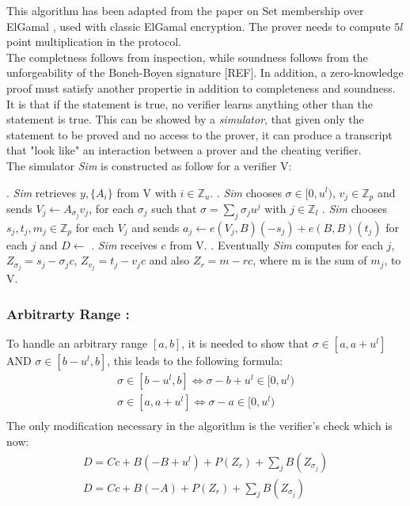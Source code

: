 \documentclass{article}
\begin{document}
This algorithm has been adapted from the paper on Set membership over ElGamal \cite{range}, used with classic ElGamal encryption. The prover needs to compute $5l$ point multiplication in the protocol.\\
The completness follows from inspection, while soundness follows from the unforgeability of the Boneh-Boyen signature [REF].
In addition, a zero-knowledge proof must satisfy another propertie in addition to completeness and soundness. It is that if the statement is true, no verifier learns anything other than the statement is true.
This can be showed by a \textit{simulator}, that given only the statement to be proved and no access to the prover, it can produce a transcript that "look like" an interaction between a prover and the cheating verifier.\\
The simulator \textit{Sim} is constructed as follow for a verifier V:\\

\begin{algorithmic}
. \textit{Sim} retrieves $y,\{A_i\}$ from V with $i \in \mathbb{Z}_u$.
. \textit{Sim} chooses $\sigma \in [0,u^l)$, $v_j \in \mathbb{Z}_p$ and sends $V_j \gets A_{\sigma_j} v_j$, for each $\sigma_j$ such that $\sigma = \sum_{j}{\sigma_j u^j}$ with $ j \in \mathbb{Z}_l$
. \textit{Sim} chooses $s_j,t_j,m_j \in \mathbb{Z}_p$ for each $V_j$ and sends $a_j \gets e(V_j,B)(-s_j) + e(B,B)(t_j)$ for each $j$ and $D \gets $
. \textit{Sim} receives $c$ from V.
. Eventually \textit{Sim} computes for each $j$, $Z_{\sigma_j} =s_j - \sigma_j c$, $Z_{v_j} = t_j - v_j c$ and also $Z_r = m - rc$, where m is the sum of $m_j$, to V.  
\end{algorithmic}

\subsubsection*{Arbitrarty Range :}
To handle an arbitrary range $[a,b]$, it is needed to show that $\sigma \in [a,a+u^l]$ AND $ \sigma \in [b-u^l,b]$, this leads to the following formula:\\
\begin{gather*}
 \sigma \in [b-u^l,b] \Longleftrightarrow   \sigma - b + u^l \in [0,u^l) \\
\sigma \in [a,a+u^l] \Longleftrightarrow   \sigma - a  \in [0,u^l)\\
\end{gather*}
The only modification necessary in the algorithm is the verifier's check which is now:
\begin{gather*}
D = Cc+B(-B+u^l)+P(Z_r)+\sum_j{B(Z_{\sigma_j})}\\
D= Cc+B(-A)+P(Z_r)+\sum_j{B(Z_{\sigma_j})}
\end{gather*}
\end{document}
